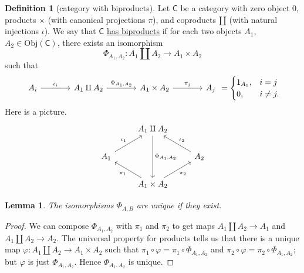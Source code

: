 \documentclass[a4paper,10pt]{scrreprt}
\newcommand{\defn}[1]{\ul{#1}}
\newcommand{\Obj}{\mathrm{Obj}}
\theoremstyle{definition}
\newtheorem{definition}{Definition}[section]
\theoremstyle{plain}
\newtheorem{lemma}{Lemma}[section]
\theoremstyle{remark}
\begin{document}
\begin{definition}[category with biproducts]
  \label{def:categorywithbiproducts}
  Let $\mathsf{C}$ be a category with zero object $0$, products $\times$ (with canonical projections $\pi$), and coproducts $\amalg$ (with natural injections $\iota$). We say that $\mathsf{C}$ \defn{has biproducts} if for each two objects $A_{1}$, $A_{2} \in \Obj(\mathsf{C})$, there exists an isomorphism
  \begin{equation*}
    \Phi_{A_{1}, A_{2}}\colon A_{1} \amalg A_{2} \to A_{1} \times A_{2}
  \end{equation*}
  such that 
  \begin{equation*}
    \begin{tikzcd}[column sep=large]
      A_{i}
      \arrow[r, "\iota_{i}"]
      & A_{1} \amalg A_{2} 
      \arrow[r, "{\Phi_{A_{1}, A_{2}}}"]
      & A_{1} \times A_{2}
      \arrow[r, "\pi_{j}"]
      & A_{j}
    \end{tikzcd}
    =
    \begin{cases}
      1_{A_{1}}, & i = j \\
      0, & i \neq j.
    \end{cases}
  \end{equation*}
  Here is a picture.
  \begin{equation*}
    \begin{tikzcd}
      & A_{1} \amalg A_{2} 
      \arrow[dd, "\Phi_{A_{1},A_{2}}"]
      \\
      A_{1} 
      \arrow[ur, "\iota_{1}"]
      & & A_{2}
      \arrow[ul, swap, "\iota_{2}"]
      \\
      & A_{1} \times A_{2}
      \arrow[ul, "\pi_{1}"]
      \arrow[ur, swap, "\pi_{2}"]
    \end{tikzcd}
  \end{equation*}
\end{definition}

\begin{lemma}
  The isomorphisms $\Phi_{A, B}$ are unique if they exist. 
\end{lemma}
\begin{proof}
  We can compose $\Phi_{A_{1}, A_{2}}$ with $\pi_{1}$ and $\pi_{2}$ to get maps $A_{1} \amalg A_{2} \to A_{1}$ and $A_{1} \amalg A_{2} \to A_{2}$. The universal property for products tells us that there is a unique map $\varphi\colon A_{1} \amalg A_{2} \to A_{1} \times A_{2}$ such that $\pi_{1} \circ \varphi = \pi_{1} \circ \Phi_{A_{1}, A_{2}}$ and $\pi_{2} \circ \varphi = \pi_{2} \circ \Phi_{A_{1}, A_{2}}$; but $\varphi$ is just $\Phi_{A_{1}, A_{2}}$. Hence $\Phi_{A_{1}, A_{2}}$ is unique.
\end{proof}
\end{document}
